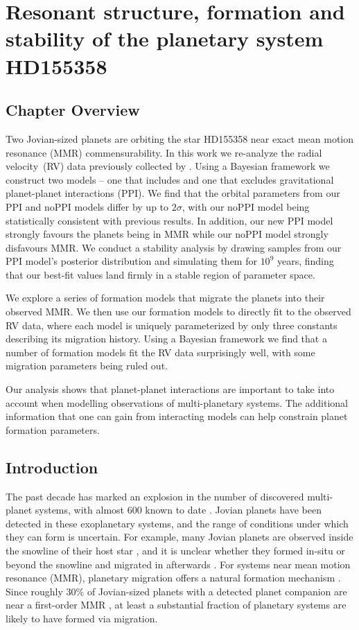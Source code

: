 \chapter[Analysis of HD155358]{Resonant structure, formation and stability of the planetary system HD155358}
\label{chap:HD155358}

\section{Chapter Overview}

Two Jovian-sized planets are orbiting the star HD155358 near exact mean motion resonance (MMR) commensurability. 
In this work we re-analyze the radial velocity~(RV) data previously collected by \citet{Robertson2012}.
Using a Bayesian framework we construct two models -- one that includes and one that excludes gravitational planet-planet interactions (PPI).
We find that the orbital parameters from our PPI and noPPI models differ by up to $2\sigma$, with our noPPI model being statistically consistent with previous results.
In addition, our new PPI model strongly favours the planets being in MMR while our noPPI model strongly disfavours MMR.
We conduct a stability analysis by drawing samples from our PPI model's posterior distribution and simulating them for $10^9$ years, finding that our best-fit values land firmly in a stable region of parameter space.

We explore a series of formation models that migrate the planets into their observed MMR.
We then use our formation models to directly fit to the observed RV data, where each model is uniquely parameterized by only three constants describing its migration history.
Using a Bayesian framework we find that a number of formation models fit the RV data surprisingly well, with some migration parameters being ruled out.

Our analysis shows that planet-planet interactions are important to take into account when modelling observations of multi-planetary systems.
The additional information that one can gain from interacting models can help constrain planet formation parameters.

\section{Introduction}
\label{sec:intro}
The past decade has marked an explosion in the number of discovered multi-planet systems, with almost 600 known to date \citep{NASAEA}. 
Jovian planets have been detected in these exoplanetary systems, and the range of conditions under which they can form is uncertain.
For example, many Jovian planets are observed inside the snowline of their host star \citep[e.g.][]{Hayashi1981}, and it is unclear whether they formed in-situ \citep{Boley2016, Huang2016, Batygin2016} or beyond the snowline and migrated in afterwards \citep{Mayor1995, Lin1996, Pollack1996}.
For systems near mean motion resonance (MMR), planetary migration offers a natural formation mechanism \citep[e.g.][]{Lee2002, Rein2009}.
Since roughly $30\%$ of Jovian-sized planets with a detected planet companion are near a first-order MMR \citep{NASAEA}, at least a substantial fraction of planetary systems are likely to have formed via migration. 

